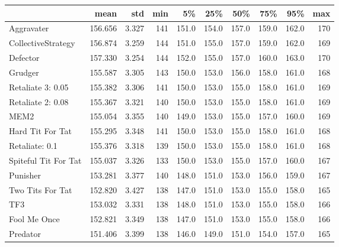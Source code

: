 \begin{tabular}{lrrrrrrrrr}
\toprule
{} &     mean &    std &  min &     5\% &    25\% &    50\% &    75\% &    95\% &  max \\
\midrule
Aggravater           &  156.656 &  3.327 &  141 &  151.0 &  154.0 &  157.0 &  159.0 &  162.0 &  170 \\
CollectiveStrategy   &  156.874 &  3.259 &  144 &  151.0 &  155.0 &  157.0 &  159.0 &  162.0 &  169 \\
Defector             &  157.330 &  3.254 &  144 &  152.0 &  155.0 &  157.0 &  160.0 &  163.0 &  170 \\
Grudger              &  155.587 &  3.305 &  143 &  150.0 &  153.0 &  156.0 &  158.0 &  161.0 &  168 \\
Retaliate 3: 0.05    &  155.382 &  3.306 &  141 &  150.0 &  153.0 &  155.0 &  158.0 &  161.0 &  169 \\
Retaliate 2: 0.08    &  155.367 &  3.321 &  140 &  150.0 &  153.0 &  155.0 &  158.0 &  161.0 &  169 \\
MEM2                 &  155.054 &  3.355 &  140 &  149.0 &  153.0 &  155.0 &  157.0 &  160.0 &  169 \\
Hard Tit For Tat     &  155.295 &  3.348 &  141 &  150.0 &  153.0 &  155.0 &  158.0 &  161.0 &  168 \\
Retaliate: 0.1       &  155.376 &  3.318 &  139 &  150.0 &  153.0 &  155.0 &  158.0 &  161.0 &  168 \\
Spiteful Tit For Tat &  155.037 &  3.326 &  133 &  150.0 &  153.0 &  155.0 &  157.0 &  160.0 &  167 \\
Punisher             &  153.281 &  3.377 &  140 &  148.0 &  151.0 &  153.0 &  156.0 &  159.0 &  167 \\
Two Tits For Tat     &  152.820 &  3.427 &  138 &  147.0 &  151.0 &  153.0 &  155.0 &  158.0 &  165 \\
TF3                  &  153.032 &  3.331 &  138 &  148.0 &  151.0 &  153.0 &  155.0 &  158.0 &  166 \\
Fool Me Once         &  152.821 &  3.349 &  138 &  147.0 &  151.0 &  153.0 &  155.0 &  158.0 &  166 \\
Predator             &  151.406 &  3.399 &  138 &  146.0 &  149.0 &  151.0 &  154.0 &  157.0 &  165 \\
\bottomrule
\end{tabular}
